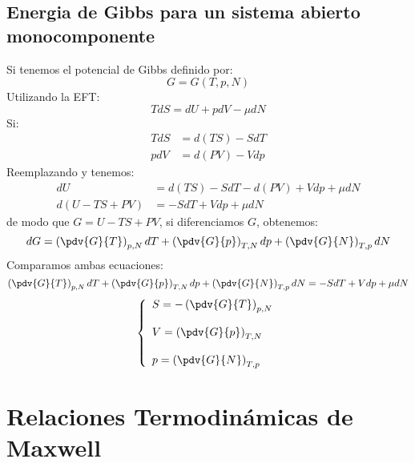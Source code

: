 \documentclass[../main]{subfiles}
\begin{document}
\section{Energia de Gibbs para un sistema abierto monocomponente}
Si tenemos el potencial de Gibbs definido por:
\begin{equation}
    G=G(T,p,N)
\end{equation}
Utilizando la EFT:
\begin{equation}
    TdS=dU+pdV-\mu dN
\end{equation}
Si:
\begin{align}
    TdS & =d(TS)-SdT \\
    pdV & =d(PV)-Vdp
\end{align}
Reemplazando y tenemos:
\begin{align}
    dU         & =d(TS)-SdT-d(PV)+Vdp+\mu dN \\
    d(U-TS+PV) & =-SdT+Vdp+\mu dN
\end{align}
de modo que $G=U-TS+PV$, si diferenciamos $G$, obtenemos:
\begin{equation}
    dG=\left ( \pdv{G}{T}\right)_{p,N}dT+\left(\pdv{G}{p}\right)_{T,N}dp+\left( \pdv{G}{N}\right)_{T,p}dN
\end{equation}
Comparamos ambas ecuaciones:
\begin{equation}
    \left ( \pdv{G}{T}\right)_{p,N}dT+\left(\pdv{G}{p}\right)_{T,N}dp+\left( \pdv{G}{N}\right)_{T,p}dN=-SdT+Vdp+\mu dN
\end{equation}
\begin{equation}
    \left\{
    \begin{array}{l}
        S=\displaystyle -\left ( \pdv{G}{T}\right)_{p,N} \\ \\
        V=\displaystyle \left(\pdv{G}{p}\right)_{T,N}    \\ \\
        p=\displaystyle \left( \pdv{G}{N}\right)_{T,p}
    \end{array}
    \right.
\end{equation}

\chapter{Relaciones Termodinámicas de Maxwell}
\end{document}
